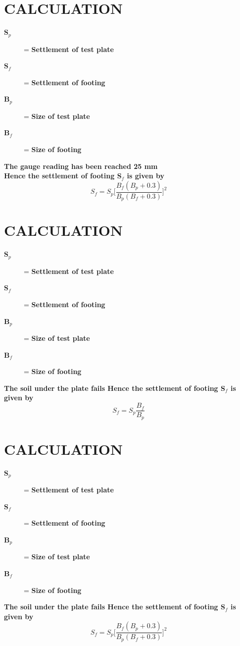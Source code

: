 \documentclass[a4paper,12pt]{article}
\begin{document}
\section*{CALCULATION}
\begin{description}
\item[\textbf{S}$_p$] = \textbf{Settlement of test plate}
\item[\textbf{S}$_f$] = \textbf{Settlement of footing} 
\item[\textbf{B}$_p$] = \textbf{Size of test plate} 
\item[\textbf{B}$_f$] = \textbf{Size of footing} 
\end{description}
$$$$
\textbf{The gauge reading has been reached 25 mm \\
Hence the settlement of footing \textbf{S}$_f$ is given by}
$$  S_f = S_p \Bigg [ \frac{B_f ( B_p + 0.3 )}{B_p ( B_f + 0.3 )} \Bigg ]^ 2 $$


\newpage
\section*{CALCULATION}
\begin{description}
\item[\textbf{S}$_p$] = \textbf{Settlement of test plate}
\item[\textbf{S}$_f$] = \textbf{Settlement of footing} 
\item[\textbf{B}$_p$] = \textbf{Size of test plate} 
\item[\textbf{B}$_f$] = \textbf{Size of footing} 
\end{description}
$$ $$
\textbf{The soil under the plate fails
Hence the settlement of footing \textbf{S}$_f$ is given by}
$$  S_f = S_p \frac{B_f}{B_p} $$ 

\newpage
\section*{CALCULATION}
\begin{description}
\item[\textbf{S}$_p$] = \textbf{Settlement of test plate}
\item[\textbf{S}$_f$] = \textbf{Settlement of footing} 
\item[\textbf{B}$_p$] = \textbf{Size of test plate} 
\item[\textbf{B}$_f$] = \textbf{Size of footing} 
\end{description}
$$$$
\textbf{The soil under the plate fails
Hence the settlement of footing \textbf{S}$_f$ is given by}
$$  S_f = S_p \Bigg [ \frac{B_f ( B_p + 0.3 )}{B_p ( B_f + 0.3 )} \Bigg ]^ 2 $$
\end{document}
